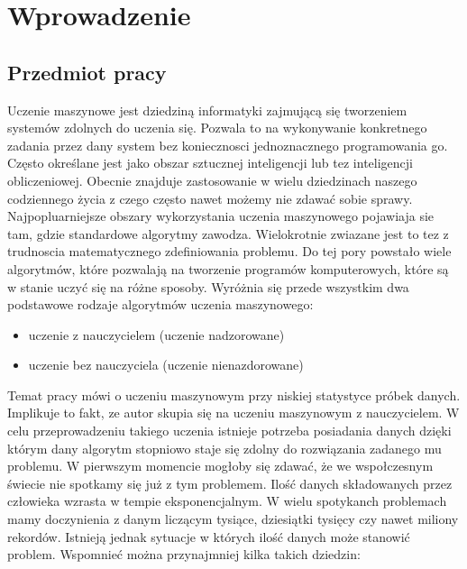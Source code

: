 \section{Wprowadzenie}
\subsection{Przedmiot pracy}
Uczenie maszynowe jest dziedziną informatyki zajmującą się tworzeniem systemów zdolnych do uczenia się. Pozwala to na wykonywanie konkretnego zadania przez dany system bez koniecznosci jednoznacznego programowania go. 
Często określane jest jako obszar sztucznej inteligencji lub tez inteligencji obliczeniowej. Obecnie znajduje zastosowanie w wielu dziedzinach naszego codziennego życia z czego często nawet możemy nie zdawać sobie sprawy.
Najpopluarniejsze obszary wykorzystania uczenia maszynowego pojawiaja sie tam, gdzie standardowe algorytmy zawodza. Wielokrotnie zwiazane jest to tez z trudnoscia matematycznego zdefiniowania problemu. 
 Do tej pory powstało wiele algorytmów, które pozwalają na tworzenie programów komputerowych, które są w stanie uczyć się na różne sposoby. Wyróżnia się przede wszystkim dwa podstawowe rodzaje algorytmów uczenia maszynowego:
\begin{itemize}
\item uczenie z nauczycielem (uczenie nadzorowane)
\item uczenie bez nauczyciela (uczenie nienazdorowane)
\end{itemize}
Temat pracy mówi o uczeniu maszynowym przy niskiej statystyce próbek danych. Implikuje to fakt, ze autor skupia się na uczeniu maszynowym z nauczycielem. W celu przeprowadzeniu takiego uczenia istnieje potrzeba posiadania danych dzięki którym dany algorytm stopniowo staje się zdolny do rozwiązania zadanego mu problemu.
 W pierwszym momencie mogłoby się zdawać, że we wspołczesnym świecie nie spotkamy się już z tym problemem. Ilość danych składowanych przez człowieka wzrasta w tempie eksponencjalnym. W wielu spotykanch problemach mamy doczynienia z danym liczącym tysiące, dziesiątki tysięcy czy nawet miliony rekordów. Istnieją jednak sytuacje w których ilość danych może stanowić problem. Wspomnieć można przynajmniej kilka takich dziedzin:
